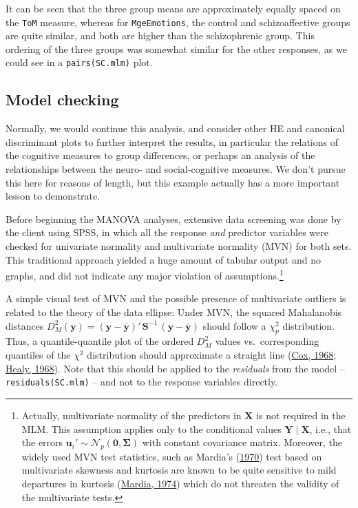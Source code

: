 \documentclass[
  letterpaper,
  10pt,
  krantz2]{krantz}
\begin{document}
It can be seen that the three group means are approximately equally
spaced on the \texttt{ToM} measure, whereas for \texttt{MgeEmotions},
the control and schizoaffective groups are quite similar, and both are
higher than the schizophrenic group. This ordering of the three groups
was somewhat similar for the other responses, as we could see in a
\texttt{pairs(SC.mlm)} plot.

\hypertarget{model-checking}{%
\subsection{Model checking}\label{model-checking}}

Normally, we would continue this analysis, and consider other HE and
canonical discriminant plots to further interpret the results, in
particular the relations of the cognitive measures to group differences,
or perhaps an analysis of the relationships between the neuro- and
social-cognitive measures. We don't pursue this here for reasons of
length, but this example actually has a more important lesson to
demonstrate.

Before beginning the MANOVA analyses, extensive data screening was done
by the client using SPSS, in which all the response \emph{and} predictor
variables were checked for univariate normality and multivariate
normality (MVN) for both sets. This traditional approach yielded a huge
amount of tabular output and no graphs, and did not indicate any major
violation of assumptions.\footnote{Actually, multivariate normality of
  the predictors in \(\mathbf{X}\) is not required in the MLM. This
  assumption applies only to the conditional values
  \(\mathbf{Y} \;|\; \mathbf{X}\), i.e., that the errors
  \(\mathbf{u}_{i}' \sim \mathcal{N}_{p}(\mathbf{0},\boldsymbol{\Sigma})\)
  with constant covariance matrix. Moreover, the widely used MVN test
  statistics, such as Mardia's
  (\protect\hyperlink{ref-Mardia:1970:MMS}{1970}) test based on
  multivariate skewness and kurtosis are known to be quite sensitive to
  mild departures in kurtosis
  (\protect\hyperlink{ref-Mardia:1974}{Mardia, 1974}) which do not
  threaten the validity of the multivariate tests.}

A simple visual test of MVN and the possible presence of multivariate
outliers is related to the theory of the data ellipse: Under MVN, the
squared Mahalanobis distances
\(D^2_M (\mathbf{y}) = (\mathbf{y} - \bar{\mathbf{y}})' \, \mathbf{S}^{-1} \, (\mathbf{y} - \bar{\mathbf{y}})\)
should follow a \(\chi^2_p\) distribution. Thus, a quantile-quantile
plot of the ordered \(D^2_M\) values vs.~corresponding quantiles of the
\(\chi^2\) distribution should approximate a straight line
(\protect\hyperlink{ref-Cox:1968}{Cox, 1968};
\protect\hyperlink{ref-Healy:1968:MNP}{Healy, 1968}). Note that this
should be applied to the \emph{residuals} from the model --
\texttt{residuals(SC.mlm)} -- and not to the response variables
directly.
\end{document}
